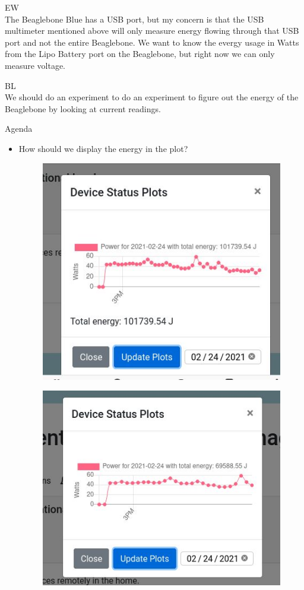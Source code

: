 \documentclass[fontsize=11pt, %
                             paper=letter, %
                             openany, %
                             captions=tableheading,
                             index=totoc,
                             hyperref]{labbook}
\begin{document}
\medbreak\indent
EW\\
\smallbreak\noindent
The Beaglebone Blue has a USB port, but my concern is that the USB multimeter mentioned above will only measure energy flowing through that USB port and not the entire Beaglebone. We want to know the evergy usage in Watts from the Lipo Battery port on the Beaglebone, but right now we can only measure voltage.

BL\\
We should do an experiment to do an experiment to figure out the energy of the Beaglebone by looking at current readings.

Agenda
\begin{itemize}
\item How should we display the energy in the plot?
\begin{figure}[H]
\centering
\includegraphics[scale=0.7]{figs/img/plotWithEnergyBelowPlot.jpg}
\end{figure}
\begin{figure}[H]
\centering
\includegraphics[scale=0.7]{figs/img/plotWithEnergyInTitle.jpg}

\end{figure}
\end{itemize}
\end{document}
